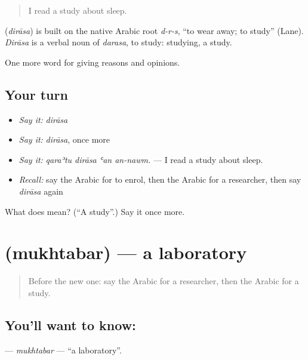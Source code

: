 \begin{quote}
I read a study about sleep.
\end{quote}

\begin{cousinweb}
\textbf{} (\emph{dirāsa}) is built on the native Arabic root \emph{d-r-s}, \textquotedblleft{}to wear away; to study\textquotedblright{} (Lane). \emph{Dirāsa} is a verbal noun of \emph{darasa}, to study: studying, a study.
\end{cousinweb}

\begin{grammarlens}[title={What you've built}]
One more word for giving reasons and opinions.
\end{grammarlens}

\subsection*{Your turn}
\begin{itemize}
\raggedright
  \item \emph{Say it:} \emph{dirāsa}
  \item \emph{Say it:} \emph{dirāsa}, once more
  \item \emph{Say it:} \emph{qaraʾtu dirāsa ʿan an-nawm.} — I read a study about sleep.
  \item \emph{Recall:} say the Arabic for to enrol, then the Arabic for a researcher, then say \emph{dirāsa} again
\end{itemize}

\begin{tcolorbox}[breakable,colback=teal!4,colframe=teal!35!black,title={Before you move on}]
What does  mean? (\textquotedblleft{}A study\textquotedblright{}.) Say it once more.
\end{tcolorbox}
\section[\texorpdfstring{\ar{مختبر} (mukhtabar)}{مختبر (mukhtabar)}]{ (mukhtabar) — a laboratory}

\label{lesson:AR-C391-mukhtabar}



\begin{quote}
Before the new one: say the Arabic for a researcher, then the Arabic for a study.
\end{quote}

\subsection*{You'll want to know: }
\textbf{} — \emph{mukhtabar} — \textquotedblleft{}a laboratory\textquotedblright{}.

